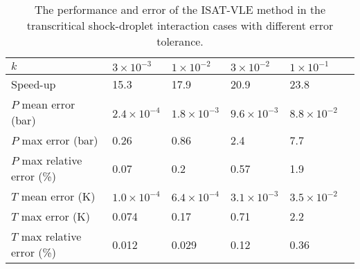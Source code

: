 \begin{table}%
	\caption{The performance and error of the ISAT-VLE method in the transcritical shock-droplet interaction cases with different error tolerance.}\label{droplet_FC_table}
	\begin{tabular*}{0.9\textwidth}{@{} l|lllll@{} }
		\toprule
		$k$                         & $3\times 10^{-3}$    & $1\times 10^{-2}$    &$3\times 10^{-2}$    & $1\times 10^{-1}$\\
		\midrule
		Speed-up                    & 15.3                 & 17.9                 & 20.9                &  23.8\\
		$P$ mean error (bar)        & $2.4\times 10^{-4}$  & $1.8\times 10^{-3}$  & $9.6\times 10^{-3}$ & $8.8\times 10^{-2}$\\
		$P$ max error (bar)         & 0.26                 & 0.86                 & 2.4                 & 7.7 \\
		$P$ max relative error (\%) & 0.07                 & 0.2                  & 0.57                & 1.9 \\
		$T$ mean error (K)          & $1.0\times 10^{-4}$  & $6.4\times 10^{-4}$  & $3.1\times 10^{-3}$ & $3.5\times 10^{-2}$\\
		$T$ max error (K)           & 0.074                & 0.17                 & 0.71                & 2.2\\
		$T$ max relative error (\%) & 0.012                & 0.029                & 0.12                & 0.36 \\
		\bottomrule
	\end{tabular*}
\end{table}


